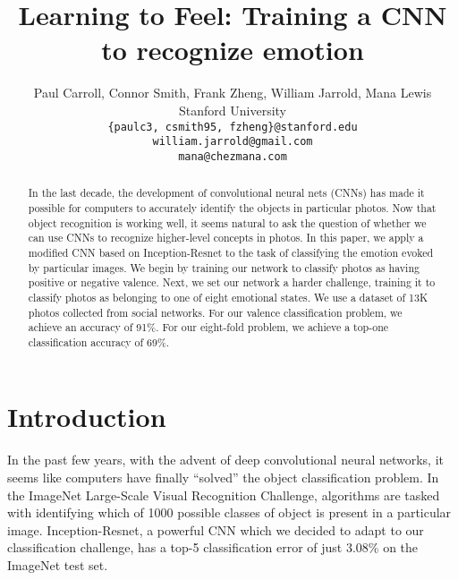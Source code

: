 \documentclass[10pt,twocolumn,letterpaper]{article}
\begin{document}
\title{Learning to Feel: Training a CNN to recognize emotion}

\author{Paul Carroll, Connor Smith, Frank Zheng, William Jarrold, Mana Lewis\footnotemark \\
Stanford University\\
{\tt\small \{paulc3, csmith95, fzheng\}@stanford.edu}\\
{\tt\small william.jarrold@gmail.com}\\
{\tt\small mana@chezmana.com}
}

\maketitle
{}

\begin{abstract}
In the last decade, the development of convolutional neural nets (CNNs) has made it possible for computers to accurately identify the objects in particular photos. Now that object recognition is working well, it seems natural to ask the question of whether we can use CNNs to recognize higher-level concepts in photos. In this paper, we apply a modified CNN based on Inception-Resnet to the task of classifying the emotion evoked by particular images. We begin by training our network to classify photos as having positive or negative valence. Next, we set our network a harder challenge, training it to classify photos as belonging to one of eight emotional states. We use a dataset of 13K photos collected from social networks. For our valence classification problem, we achieve an accuracy of 91\%. For our eight-fold problem, we achieve a top-one classification accuracy of 69\%.
\end{abstract}

\section{Introduction}
In the past few years, with the advent of deep convolutional neural networks, it seems like computers have finally ``solved'' the object classification problem. In the ImageNet Large-Scale Visual Recognition Challenge\cite{imagenet}, algorithms are tasked with identifying which of 1000 possible classes of object is present in a particular image.  Inception-Resnet, a powerful CNN which we decided to adapt to our classification challenge, has a top-5 classification error of just 3.08\% on the ImageNet test set\cite{inceptionresnet}.
\end{document}
